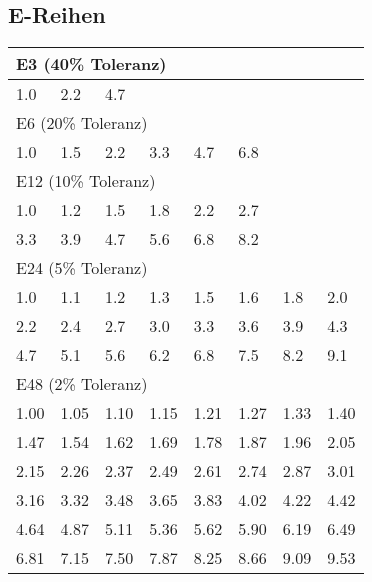 \subsection{E-Reihen}
	\begin{emphbox}
		\begin{tabular}{llllllll}
			\multicolumn{8}{l}{E3 (40\% Toleranz)}  \\
			\hline
			1.0 & 2.2 & 4.7 & & & & & \\
			\multicolumn{8}{l}{E6 (20\% Toleranz)}  \\
			\hline
			1.0 & 1.5 & 2.2 & 3.3 & 4.7 & 6.8 \\
			\multicolumn{8}{l}{E12 (10\% Toleranz)}  \\
			\hline
			1.0 & 1.2 & 1.5 & 1.8 & 2.2 & 2.7 \\
			3.3 & 3.9 & 4.7 & 5.6 & 6.8 & 8.2 \\
			\multicolumn{8}{l}{E24 (5\% Toleranz)}  \\
			\hline
			1.0 & 1.1 & 1.2 & 1.3 & 1.5 & 1.6 & 1.8 & 2.0 \\
			2.2 & 2.4 & 2.7 & 3.0 & 3.3 & 3.6 & 3.9 & 4.3 \\
			4.7 & 5.1 & 5.6 & 6.2 & 6.8 & 7.5 & 8.2 & 9.1 \\
			\multicolumn{8}{l}{E48 (2\% Toleranz)}  \\
			\hline
			1.00 & 1.05 & 1.10 & 1.15 & 1.21 & 1.27 & 1.33 & 1.40 \\
			1.47 & 1.54 & 1.62 & 1.69 & 1.78 & 1.87 & 1.96 & 2.05 \\
			2.15 & 2.26 & 2.37 & 2.49 & 2.61 & 2.74 & 2.87 & 3.01 \\
			3.16 & 3.32 & 3.48 & 3.65 & 3.83 & 4.02 & 4.22 & 4.42 \\
			4.64 & 4.87 & 5.11 & 5.36 & 5.62 & 5.90 & 6.19 & 6.49 \\
			6.81 & 7.15 & 7.50 & 7.87 & 8.25 & 8.66 & 9.09 & 9.53 \\
		\end{tabular}
	\end{emphbox}
